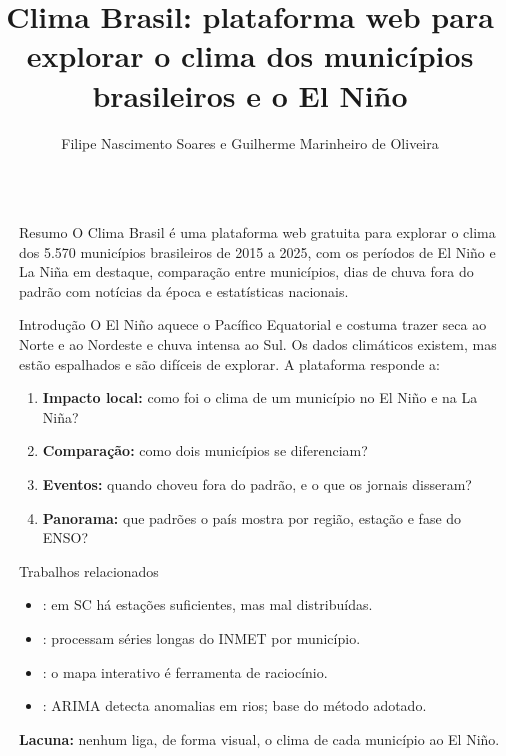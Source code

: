 \documentclass{beamer}
\title{Clima Brasil: plataforma web para explorar o clima dos municípios brasileiros e o El Niño}
\author{Filipe Nascimento Soares e Guilherme Marinheiro de Oliveira}
\institute[shortinst]{Bacharelado em ciência da computação, IF Goiano - Campus Rio Verde}
\newlength{\sepwidth}
\newlength{\colwidth}
\newcommand{\separatorcolumn}{\begin{column}{\sepwidth}\end{column}}
\begin{document}

	\begin{frame}[t]
		\begin{columns}[t]

			\separatorcolumn
			\begin{column}{\colwidth}
			    \begin{block}{Resumo}
			    	\small{O Clima Brasil é uma plataforma web gratuita para explorar o clima dos 5.570 municípios
			    	brasileiros de 2015 a 2025, com os períodos de El Niño e La Niña em destaque, comparação entre
			    	municípios, dias de chuva fora do padrão com notícias da época e estatísticas nacionais.}
			    \end{block}

			    \begin{block}{Introdução}
			        O El Niño aquece o Pacífico Equatorial e costuma trazer seca ao Norte e ao Nordeste e chuva
			        intensa ao Sul. Os dados climáticos existem, mas estão espalhados e são difíceis de explorar.
			        A plataforma responde a:

			        \begin{enumerate}
			        	\item \textbf{Impacto local:} como foi o clima de um município no El Niño e na La Niña?
			        	\item \textbf{Comparação:} como dois municípios se diferenciam?
			        	\item \textbf{Eventos:} quando choveu fora do padrão, e o que os jornais disseram?
			        	\item \textbf{Panorama:} que padrões o país mostra por região, estação e fase do ENSO?
			        \end{enumerate}
			    \end{block}

			    \begin{block}{Trabalhos relacionados}

			        \begin{itemize}
			        	\item \citet{vianna2021estacoes}: em SC há estações suficientes, mas mal distribuídas.
			        	\item \citet{ribeiro2026ml}: processam séries longas do INMET por município.
			        	\item \citet{roth2013interactive}: o mapa interativo é ferramenta de raciocínio.
			        	\item \citet{leigh2019framework}: ARIMA detecta anomalias em rios; base do método adotado.
			        \end{itemize}
			        \textbf{Lacuna:} nenhum liga, de forma visual, o clima de cada município ao El Niño.
			    \end{block}


\end{column}
\end{columns}
\end{frame}
\end{document}
